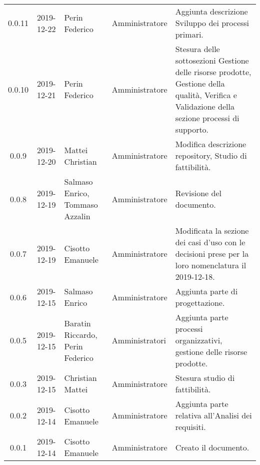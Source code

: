 {\begin{longtable}{c c  C{4cm}  C{3cm} C{4cm}}
0.0.11 & 2019-12-22 & Perin Federico  & Amministratore & Aggiunta descrizione Sviluppo dei processi primari. \\

0.0.10 & 2019-12-21 & Perin Federico & Amministratore & Stesura delle sottosezioni Gestione delle risorse prodotte, Gestione della qualità, Verifica e Validazione della sezione processi di supporto. \\

0.0.9 & 2019-12-20 & Mattei Christian & Amministratore & Modifica descrizione repository, Studio di fattibilità. \\

0.0.8 & 2019-12-19 & Salmaso Enrico, Tommaso Azzalin & Amministratore & Revisione del documento. \\

0.0.7 & 2019-12-19 & Cisotto Emanuele & Amministratore & Modificata la sezione dei casi d’uso con le decisioni prese per la loro nomenclatura il 2019-12-18. \\

0.0.6 & 2019-12-15 & Salmaso Enrico & Amministratore & Aggiunta parte di progettazione. \\

0.0.5 & 2019-12-15 & Baratin Riccardo, Perin Federico  & Amministratori & Aggiunta parte processi organizzativi, gestione delle risorse prodotte. \\

0.0.3 & 2019-12-15 & Christian Mattei & Amministratore & Stesura studio di fattibilità. \\

0.0.2 & 2019-12-14 & Cisotto Emanuele & Amministratore & Aggiunta parte relativa all’Analisi dei requisiti. \\

0.0.1 & 2019-12-14 & Cisotto Emanuele & Amministratore & Creato il documento. \\
		
\end{longtable}
}